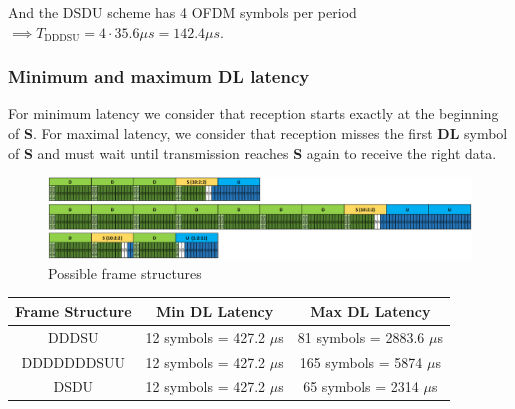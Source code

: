 \documentclass[]{article}
\begin{document}
	And the DSDU scheme has 4 OFDM symbols per period $\implies T_{\text{DDDSU}} = 4 \cdot 35.6 \mu s = 142.4 \mu s$.
	
	\subsubsection*{Minimum and maximum DL latency}
	
	For minimum latency we consider that reception starts exactly at the beginning of \textbf{S}. For maximal latency, we consider that reception misses the first \textbf{DL} symbol of \textbf{S} and must wait until transmission reaches \textbf{S} again to receive the right data.
	
	\begin{figure}[h!]
		\centering
		\includegraphics[scale=0.7]{5GframeSchemesQuestion9.PNG}
		\caption{Possible frame structures}
	\end{figure}
	
	\begin{table}[h]
		\centering
		\begin{tabular}{|c|c|c|}
			\hline
			\textbf{Frame Structure} & \textbf{Min DL Latency} & \textbf{Max DL Latency} \\
			\hline
			DDDSU & 12 symbols = 427.2 $\mu$s & 81 symbols = 2883.6 $\mu$s \\
			\hline
			DDDDDDDSUU & 12 symbols = 427.2 $\mu$s & 165 symbols = 5874 $\mu$s \\
			\hline
			DSDU & 12 symbols = 427.2 $\mu$s & 65 symbols = 2314 $\mu$s \\
			\hline
		\end{tabular}
	\end{table}
	
\end{document}
